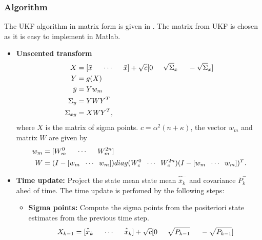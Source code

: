 \subsubsection{Algorithm}
The UKF algorithm in matrix form is given in \citep{sim07}. The matrix from UKF is chosen as it is easy to implement in Matlab.
\begin{itemize}
    \item \textbf{Unscented transform}
    \begin{equation}
        \begin{split}
            X &= [ \bar x \hspace{5mm} \cdots \hspace{5mm} \bar x ]+ \sqrt c [ 0 \hspace{5mm} \sqrt \Sigma_x \hspace{5mm} - \sqrt \Sigma_x ]\\
            Y &= g(X) \\
            \bar y &= Y w_m\\
            \Sigma_y &= Y W Y^T \\
            \Sigma_{xy} &= X W Y^T,
        \end{split}
    \end{equation}
    where $X$ is the matrix of sigma points. $c=\alpha^2(n+\kappa)$, the vector $w_m$ and matrix $W$ are given by
    \begin{equation}
        \begin{split}
        w_m &= [W_m^0 \hspace{5mm} \cdots \hspace{5mm} W_m^{2n} ]\\
        W &= (I-[w_m \hspace{2mm} \cdots \hspace{2mm} w_m])diag(W_c^0 \hspace{2mm} \cdots \hspace{2mm} W_c^{2n}) (I-[w_m \hspace{2mm} \cdots \hspace{2mm} w_m])^T.
        \end{split}
    \end{equation} 
    
    \item \textbf{Time update:} Project the state mean state mean $\hat{\bar x}^-_k$ and covariance ${\bar P}^-_k$ ahed of time. The time update is perfomed by the following steps:
    \begin{itemize}
        \item \textbf{Sigma points:} Compute the sigma points from the positeriori state estimates from the previous time step.
        \begin{equation}
        X_{k-1} = [ \hat{\bar{x}}_k \hspace{5mm} \cdots \hspace{5mm} \hat{\bar{x}}_k]+ \sqrt c [ 0 \hspace{5mm} \sqrt{P_{k-1}} \hspace{5mm} - \sqrt{P_{k-1}} ]
        \end{equation}


\end{itemize}
\end{itemize}
